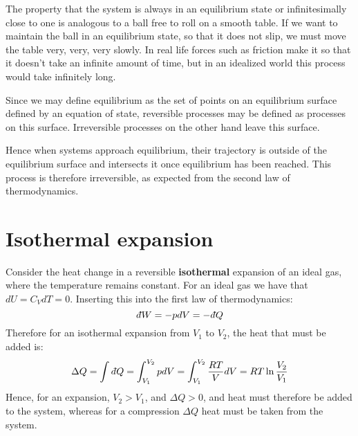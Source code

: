 \documentclass[a4paper,11pt,oneside]{book}
\newcommand{\dbar}{d\hspace*{-0.08em}\bar{}\hspace*{0.1em}}
\begin{document}
The property that the system is always 
in an equilibrium state or infinitesimally close to one is analogous to a ball free to roll on a smooth table. If we want to maintain the ball in an equilibrium state, so that it does not slip, we must move the table very, very, very slowly. In real life forces such as friction make it so that it doesn't take an infinite amount of time, but in an idealized world this process would take infinitely long. 

Since we may define equilibrium as the set of points on an equilibrium surface defined by an equation of state, reversible processes may be defined as processes on this surface. Irreversible processes on the other hand leave this surface. 

Hence when systems approach equilibrium, their trajectory is outside of the equilibrium surface and intersects it once equilibrium has been reached. This process is therefore irreversible, as expected from the second law of thermodynamics. 

\section{Isothermal expansion}
Consider the heat change in a reversible \textbf{isothermal} expansion of an ideal gas, where the temperature remains constant. For an ideal gas we have that $dU = C_V dT = 0$. Inserting this into the first law of thermodynamics:
\begin{equation}
    \dbar W = -pdV=- \dbar Q
\end{equation}
Therefore for an isothermal expansion from $V_1$ to $V_2$, the heat that must be added is:
\begin{equation}
    \Delta Q = \int \dbar Q = \int_{V_1}^{V_2} p dV = \int_{V_1}^{V_2} \frac{RT}{V} dV = RT \ln \frac{V_2}{V_1}
\end{equation}
Hence, for an expansion, $V_2 > V_1$, and $\Delta Q > 0$, and heat must therefore be added to the system, whereas for a compression $\Delta Q$ heat must be taken from the system.
\end{document}
